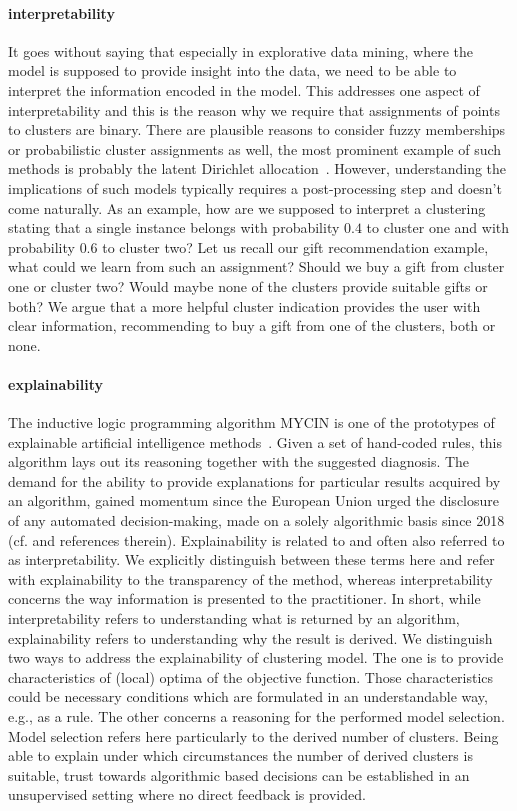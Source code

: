 \paragraph{interpretability} 
It goes without saying that especially in explorative data mining, where the model is supposed to provide insight into the data, we need to be able to interpret the information encoded in the model. This addresses one aspect of interpretability and this is the reason why we require that assignments of points to clusters are binary. There are plausible reasons to consider fuzzy memberships or probabilistic cluster assignments as well, the most prominent example of such methods is probably the latent Dirichlet allocation~\citep{blei2003latent}. However, understanding the implications of such models typically requires a post-processing step and doesn't come naturally. As an example, how are we supposed to interpret a clustering stating that a single instance belongs with probability $0.4$ to cluster one and with probability $0.6$ to cluster two? Let us recall our gift recommendation example, what could we learn from such an assignment? Should we buy a gift from cluster one or cluster two? Would maybe none of the clusters provide suitable gifts or both? We argue that a more helpful cluster indication provides the user with clear information, recommending to buy a gift from one of the clusters, both or none.  
\paragraph{explainability} 
The inductive logic programming algorithm MYCIN is one of the prototypes of explainable artificial intelligence methods~\citep{fagan1980computer}. Given a set of hand-coded rules, this algorithm lays out its reasoning together with the suggested diagnosis. 
The demand for the ability to provide explanations for particular results acquired by an algorithm, gained momentum since the European Union urged the disclosure of any automated decision-making, made on a solely algorithmic basis since 2018 (cf.\@ \cite{doshi2017towards} and references therein). Explainability is related to and often also referred to as interpretability. We explicitly distinguish between these terms here and refer with explainability to the transparency of the method, whereas interpretability concerns the way information is presented to the practitioner. In short, while interpretability refers to understanding what is returned by an algorithm, explainability refers to understanding why the result is derived. We distinguish two ways to address the explainability of clustering model. The one is to provide characteristics of (local) optima of the objective function. Those characteristics could be necessary conditions which are formulated in an understandable way, e.g., as a rule. The other concerns a reasoning for the performed model selection. Model selection refers here particularly to the derived number of clusters. Being able to explain under which circumstances the number of derived clusters is suitable, trust towards algorithmic based decisions can be established in an unsupervised setting where no direct feedback is provided.

